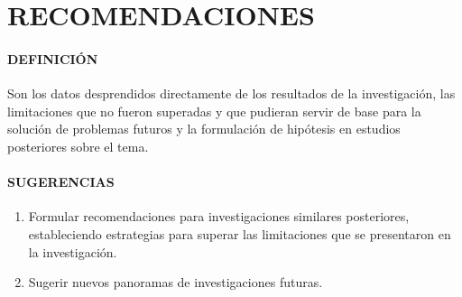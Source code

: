 \section{RECOMENDACIONES}

\paragraph{DEFINICIÓN}
Son los datos desprendidos directamente de los resultados de la investigación, las limitaciones que no fueron superadas y que pudieran servir de base para la solución de problemas futuros y la formulación de hipótesis en estudios posteriores sobre el tema.

\paragraph{SUGERENCIAS}

\begin{enumerate}
 \item Formular recomendaciones para investigaciones similares posteriores, estableciendo estrategias para superar las limitaciones que se presentaron en la investigación.
 \item Sugerir nuevos panoramas de investigaciones futuras.
\end{enumerate}